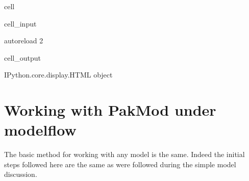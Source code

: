\documentclass[letterpaper,10pt,english]{jupyterBook}
\begin{document}
\begin{sphinxuseclass}{cell}\begin{sphinxVerbatimInput}

\begin{sphinxuseclass}{cell_input}
\begin{sphinxVerbatim}[commandchars=\\\{\}]
    
        

   

 autoreload   
 2
\end{sphinxVerbatim}

\end{sphinxuseclass}\end{sphinxVerbatimInput}
\begin{sphinxVerbatimOutput}

\begin{sphinxuseclass}{cell_output}
\begin{sphinxVerbatim}[commandchars=\\\{\}]
\PYGZlt{}IPython.core.display.HTML object\PYGZgt{}
\end{sphinxVerbatim}

\end{sphinxuseclass}\end{sphinxVerbatimOutput}

\end{sphinxuseclass}

\chapter{Working with PakMod under modelflow}
\label{\detokenize{content/06_WBModels/LoadingWBModel:working-with-pakmod-under-modelflow}}
\sphinxAtStartPar
The basic method for working with any model is the same. Indeed the initial steps followed here are the same as were followed during the simple model discussion.
\end{document}
